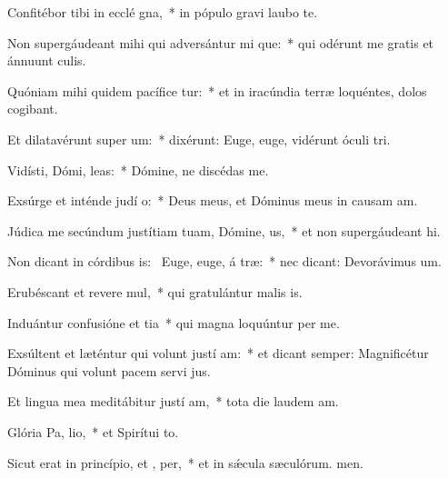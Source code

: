 \item Confitébor tibi in ecclé gna,~* in pópulo gravi laubo te.
\item Non supergáudeant mihi qui adversántur mi que:~* qui odérunt me gratis et ánnuunt culis.
\item Quóniam mihi quidem pacífice tur:~* et in iracúndia terræ loquéntes, dolos cogibant.
\item Et dilatavérunt super   um:~* dixérunt: Euge, euge, vidérunt óculi tri.
\item Vidísti, Dómi,  leas:~* Dómine, ne discédas  me.
\item Exsúrge et inténde judí o:~* Deus meus, et Dóminus meus in causam am.
\item Júdica me secúndum justítiam tuam, Dómine,  us,~* et non supergáudeant hi.
\item Non dicant in córdibus is:~\pscross{} Euge, euge, á træ:~* nec dicant: Devorávimus um.
\item Erubéscant et revere mul,~* qui gratulántur malis is.
\item Induántur confusióne et tia~* qui magna loquúntur per me.
\item Exsúltent et læténtur qui volunt justí am:~* et dicant semper: Magnificétur Dóminus qui volunt pacem servi jus.
\item Et lingua mea meditábitur justí am,~* tota die laudem am.
\item Glória Pa,  lio,~* et Spirítui to.
\item Sicut erat in princípio, et ,  per,~* et in sǽcula sæculórum. men.
